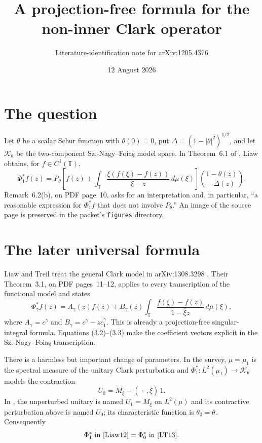 \documentclass[11pt]{article}
\title{A projection-free formula for the non-inner Clark operator}
\author{Literature-identification note for arXiv:1205.4376}
\date{12 August 2026}
\newcommand{\T}{\mathbb T}
\newcommand{\K}{\mathcal K}
\newcommand{\Dlt}{\Delta}
\begin{document}
\maketitle

\begin{center}
\end{center}

\section{The question}

Let $\theta$ be a scalar Schur function with $\theta(0)=0$, put
$\Dlt=(1-|\theta|^2)^{1/2}$, and let $\K_\theta$ be the two-component
Sz.-Nagy--Foia\c{s} model space.  In Theorem~6.1 of \cite{Liaw12}, Liaw
obtains, for $f\in C^1(\T)$,
\[
 \Phi_1^*f(z)=P_\theta\left[
 f(z)+\int_\T\frac{\xi(f(\xi)-f(z))}{\xi-z}\,d\mu(\xi)
 \right]
 \binom{1-\theta(z)}{-\Dlt(z)}.
\]
Remark~6.2(b), on PDF page~10, asks for an interpretation and, in particular,
``a reasonable expression for $\Phi_1^*f$ that does not involve
$P_\theta$.''  An image of the source page is preserved in the packet's
\texttt{figures} directory.

\section{The later universal formula}

Liaw and Treil treat the general Clark model in arXiv:1308.3298
\cite{LT13}.  Their Theorem~3.1, on PDF pages~11--12, applies to every
transcription of the functional model and states
\begin{equation}\label{eq:universal}
 \Phi_\gamma^*f(z)=A_\gamma(z)f(z)
 +B_\gamma(z)\int_\T
 \frac{f(\xi)-f(z)}{1-\overline\xi z}\,d\mu(\xi),
\end{equation}
where $A_\gamma=c^\gamma$ and
$B_\gamma=c^\gamma-zc_1^\gamma$.  This is already a projection-free
singular-integral formula.  Equations (3.2)--(3.3) make the coefficient
vectors explicit in the Sz.-Nagy--Foia\c{s} transcription.

There is a harmless but important change of parameters.  In the survey,
$\mu=\mu_1$ is the spectral measure of the unitary Clark perturbation and
$\Phi_1^*:L^2(\mu_1)\to\K_\theta$ models the contraction
\[
 U_0=M_\xi-(\,\cdot\,,\overline\xi)\,1.
\]
In \cite{LT13}, the unperturbed unitary is named $U_1=M_\xi$ on
$L^2(\mu)$ and its contractive perturbation above is named $U_0$; its
characteristic function is $\theta_0=\theta$.  Consequently
\[
 \Phi_1^*\ \text{in \cite{Liaw12}}
 =\Phi_0^*\ \text{in \cite{LT13}}.
\]
\end{document}
